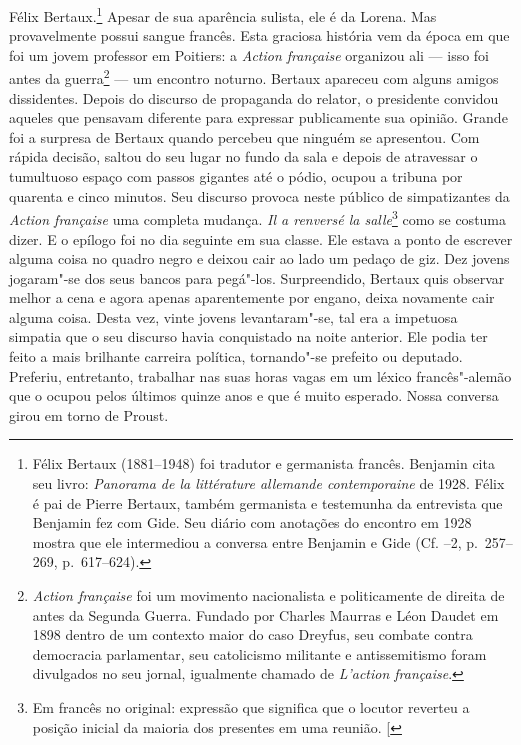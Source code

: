 Félix Bertaux.\footnote{Félix Bertaux (1881--1948) foi tradutor e germanista francês. Benjamin cita seu livro:  \emph{Panorama de la littérature allemande contemporaine} de 1928. Félix é pai de Pierre Bertaux, também germanista e testemunha da entrevista que Benjamin fez com Gide. Seu diário com anotações do encontro em 1928 mostra que ele intermediou a conversa entre Benjamin e Gide (Cf. --2, p.~257--269, p.~617--624). \versal{[N.~O.]}} Apesar de sua aparência sulista,
ele é da Lorena. Mas provavelmente possui sangue francês. Esta graciosa
história vem da época em que foi um jovem professor em Poitiers: a
\emph{Action française} organizou ali --- isso foi antes da
guerra\footnote{\emph{Action française} foi um movimento %
  nacionalista e politicamente de direita de antes da Segunda Guerra.
  Fundado por Charles Maurras e Léon Daudet em 1898 dentro de um
  contexto maior do caso Dreyfus, seu combate contra democracia
  parlamentar, seu catolicismo militante e antissemitismo foram
  divulgados no seu jornal, igualmente chamado de \emph{L'action
  française}. \versal{[N.~O.]}} --- um encontro noturno. Bertaux apareceu com alguns
amigos dissidentes. Depois do discurso de propaganda do relator, o
presidente convidou aqueles que pensavam diferente para expressar
publicamente sua opinião. Grande foi a surpresa de Bertaux quando
percebeu que ninguém se apresentou. Com rápida decisão, saltou do seu
lugar no fundo da sala e depois de atravessar o tumultuoso espaço com
passos gigantes até o pódio, ocupou a tribuna por quarenta e cinco
minutos. Seu discurso provoca neste público de simpatizantes da
\emph{Action française} uma completa mudança. \emph{Il a renversé la
salle}\footnote{Em francês no original: expressão que significa que o locutor reverteu a posição inicial da maioria dos presentes em uma reunião. {[}\versal{N.~T.}{]}} como se costuma dizer. E o epílogo foi no dia seguinte em sua
classe. Ele estava a ponto de escrever alguma coisa no quadro negro e
deixou cair ao lado um pedaço de giz. Dez jovens jogaram"-se dos seus
bancos para pegá"-los. Surpreendido, Bertaux quis observar melhor a cena
e agora apenas aparentemente por engano, deixa novamente cair alguma
coisa. Desta vez, vinte jovens levantaram"-se, tal era a impetuosa
simpatia que o seu discurso havia conquistado na noite anterior. Ele
podia ter feito a mais brilhante carreira política, tornando"-se
prefeito ou deputado. Preferiu, entretanto, trabalhar nas suas horas vagas
em um léxico francês"-alemão que o ocupou pelos últimos quinze anos e que
é muito esperado. Nossa conversa girou em torno de Proust.
